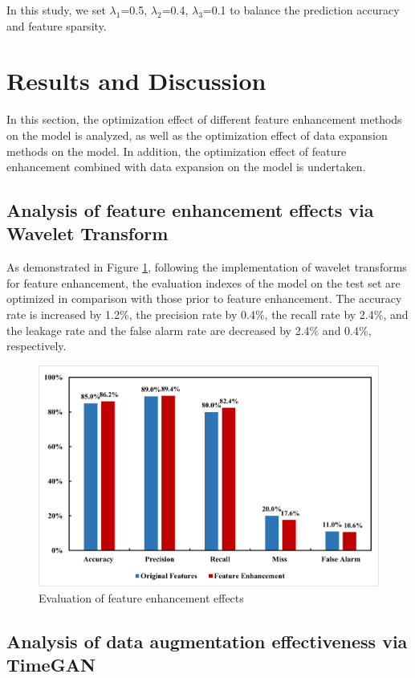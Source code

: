 \documentclass[journal,article,submit,pdftex,moreauthors]{Definitions/mdpi}
\begin{document}
In this study, we set \({{\lambda }_{1}}\)=0.5, \({{\lambda }_{2}}\)=0.4, \({{\lambda }_{3}}\)=0.1 to balance the prediction accuracy and feature sparsity.

\section{Results and Discussion}

In this section, the optimization effect of different feature enhancement methods on the model is analyzed, as well as the optimization effect of data expansion methods on the model. In addition, the optimization effect of feature enhancement combined with data expansion on the model is undertaken.

\subsection{Analysis of feature enhancement effects via Wavelet Transform}

As demonstrated in Figure \ref{fig:Evaluation of feature enhancement effects}, following the implementation of wavelet transforms for feature enhancement, the evaluation indexes of the model on the test set are optimized in comparison with those prior to feature enhancement. The accuracy rate is increased by 1.2\%, the precision rate by 0.4\%, the recall rate by 2.4\%, and the leakage rate and the false alarm rate are decreased by 2.4\% and 0.4\%, respectively.

\begin{figure}[H]
    \centering
    \includegraphics[width=0.75\linewidth]{图片/特征增强.png}
    \caption{Evaluation of feature enhancement effects}
    \label{fig:Evaluation of feature enhancement effects}
\end{figure}

\subsection{Analysis of data augmentation effectiveness via TimeGAN}
\end{document}
